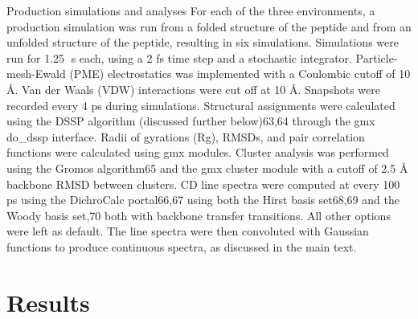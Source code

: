 Production simulations and analyses
For each of the three environments, a production simulation was run from a folded structure of the peptide and from an unfolded structure of the peptide, resulting in six simulations. Simulations were run for 1.25 s each, using a 2 fs time step and a stochastic integrator. Particle-mesh-Ewald (PME) electrostatics was implemented with a Coulombic cutoff of 10 Å. Van der Waals (VDW) interactions were cut off at 10 Å. Snapshots were recorded every 4 ps during simulations.
Structural assignments were calculated using the DSSP algorithm (discussed further below)63,64 through the gmx do\_dssp interface. Radii of gyrations (Rg), RMSDs, and pair correlation functions were calculated using gmx modules. Cluster analysis was performed using the Gromos algorithm65 and the gmx cluster module with a cutoff of 2.5 Å backbone RMSD between clusters. CD line spectra were computed at every 100 ps using the DichroCalc portal66,67 using both the Hirst basis set68,69 and the Woody basis set,70 both with backbone transfer transitions. All other options were left as default. The line spectra were then convoluted with Gaussian functions to produce continuous spectra, as discussed in the main text.

\section{Results}
%

